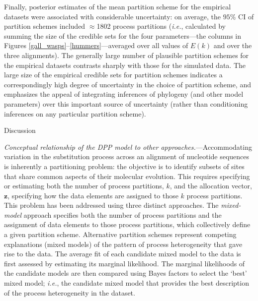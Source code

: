 \documentclass[11pt]{article}
\begin{document}
Finally, posterior estimates of the mean partition scheme for the empirical datasets were associated with considerable uncertainty: on average, the $95\%$ CI of partition schemes included $\approx$1802 process partitions ({\it i.e.}, calculated by summing the size of the credible sets for the four parameters---the columns in Figures \ref{gall_wasps}--\ref{hummers}---averaged over all values of $E(k)$ and over the three alignments).  
The generally large number of plausible partition schemes for the empirical datasets contrasts sharply with those for the simulated data. 
The large size of the empirical credible sets for partition schemes indicates a correspondingly high degree of uncertainty in the choice of partition scheme, and emphasizes the appeal of integrating inferences of phylogeny (and other model parameters) over this important source of uncertainty (rather than conditioning inferences on any particular partition scheme).

\bigskip
\begin{center}
{\sc Discussion}
\end{center}

\bigskip
\noindent
{\it Conceptual relationship of the DPP model to other approaches.}---Accommodating variation in the substitution process across an alignment of nucleotide sequences is inherently a partitioning problem:
the objective is to identify subsets of sites that share common aspects of their molecular evolution.
This requires specifying or estimating both the number of process partitions, $k$, and the allocation vector, ${\mathbf z}$, specifying how the data elements are assigned to those $k$ process partitions.
This problem has been addressed using three distinct approaches.
The \emph{mixed-model} approach \citep[{\it e.g.},][]{ronquist03} specifies both the number of process partitions and the assignment of data elements to those process partitions, which collectively define a given partition scheme.
Alternative partition schemes represent competing explanations (mixed models) of the pattern of process heterogeneity that gave rise to the data.
The average fit of each candidate mixed model to the data is first assessed by estimating its marginal likelihood.
The marginal likelihoods of the candidate models are then compared using Bayes factors to select the `best' mixed model; {\it i.e.}, the candidate mixed model that provides the best description of the process heterogeneity in the dataset.
\end{document}
